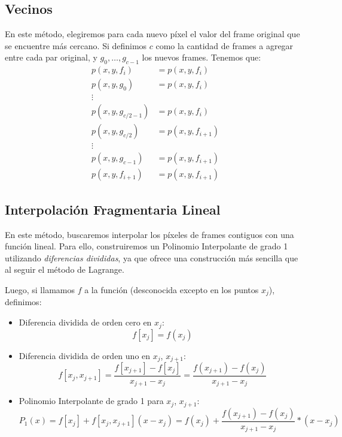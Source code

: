 \subsection{Vecinos}\label{Vecinos}
En este método, elegiremos para cada nuevo píxel el valor del frame original que se encuentre
más cercano.
Si definimos $c$ como la cantidad de frames a agregar entre cada par original, y
$g_0, \dots, g_{c-1}$ los nuevos frames. Tenemos que:
\begin{equation*}
    \begin{aligned}
        p(x,y,f_{i}) &= p(x,y,f_{i})\\
        p(x,y,g_{0}) &= p(x,y,f_{i})\\
        \vdots\\
        p(x,y,g_{c/2-1}) &= p(x,y,f_{i})\\
        p(x,y,g_{c/2}) &= p(x,y,f_{i+1})\\
        \vdots\\
        p(x,y,g_{c-1}) &= p(x,y,f_{i+1})\\
        p(x,y,f_{i+1}) &= p(x,y,f_{i+1})
    \end{aligned}
\end{equation*}

\subsection{Interpolación Fragmentaria Lineal}\label{Lineal}
En este método, buscaremos interpolar los píxeles de frames contiguos con una función
lineal. Para ello, construiremos un Polinomio Interpolante de grado 1 utilizando
\textit{diferencias divididas}, ya que ofrece una construcción más sencilla que al seguir
el método de Lagrange.

Luego, si llamamos $f$ a la función (desconocida excepto en los puntos $x_j$), definimos:
\begin{itemize}
    \item Diferencia dividida de orden cero en $x_j$:
        \begin{equation*}
            f[x_j] = f(x_j)
        \end{equation*}
    \item Diferencia dividida de orden uno en $x_j$, $x_{j+1}$:
        \begin{equation*}
            f[x_j,x_{j+1}]= \frac{f[x_{j+1}] - f[x_j]}{x_{j+1} - x_j} = \frac{f(x_{j+1}) - f(x_j)}{x_{j+1} - x_j}
        \end{equation*}
    \item Polinomio Interpolante de grado 1 para $x_j$, $x_{j+1}$:
        \begin{equation*}
            P_1(x) = f[x_j] + f[x_j,x_{j+1}](x-x_j) = f(x_j) + \frac{f(x_{j+1}) - f(x_j)}{x_{j+1} - x_j}*(x-x_j)
        \end{equation*}
\end{itemize}

